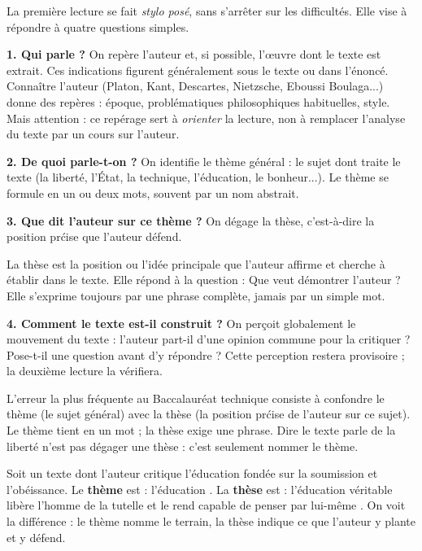 \documentclass[11pt]{article}
\newcommand{\cle}[1]{{\popxbold\color{popdark}#1}}
\newcounter{popsec}
\newcounter{popsub}
\newcommand{\courssub}[1]{%
  \stepcounter{popsub}%
  \par\vspace{9pt}\noindent{\popxbold\fontsize{11.5}{13}\selectfont\color{popink}{\color{poporange}\thepopsec.\thepopsub}\hspace{6pt}#1}\par\nopagebreak\vspace{4pt}
}
\begin{document}
\courssub{La premi\`ere lecture : lecture globale}

La premi\`ere lecture se fait \emph{stylo pos\'e}, sans s'arr\^eter sur les difficult\'es. Elle vise \`a r\'epondre \`a quatre questions simples.

\textbf{1. Qui parle ?} On rep\`ere l'\cle{auteur} et, si possible, l'\cle{\oe uvre} dont le texte est extrait. Ces indications figurent g\'en\'eralement sous le texte ou dans l'\'enonc\'e. Conna\^itre l'auteur (Platon, Kant, Descartes, Nietzsche, Eboussi Boulaga...) donne des rep\`eres : \'epoque, probl\'ematiques philosophiques habituelles, style. Mais attention : ce rep\'erage sert \`a \emph{orienter} la lecture, non \`a remplacer l'analyse du texte par un cours sur l'auteur.

\textbf{2. De quoi parle-t-on ?} On identifie le \cle{th\`eme g\'en\'eral} : le sujet dont traite le texte (la libert\'e, l'\'Etat, la technique, l'\'education, le bonheur...). Le th\`eme se formule en un ou deux mots, souvent par un nom abstrait.

\textbf{3. Que dit l'auteur sur ce th\`eme ?} On d\'egage la \cle{th\`ese}, c'est-\`a-dire la position pr\'cise que l'auteur d\'efend.

\begin{definition}[La th\`ese]
La \cle{th\`ese} est la position ou l'id\'ee principale que l'auteur affirme et cherche \`a \'etablir dans le texte. Elle r\'epond \`a la question : \og Que veut d\'emontrer l'auteur ? \fg Elle s'exprime toujours par une phrase compl\`ete, jamais par un simple mot.
\end{definition}

\textbf{4. Comment le texte est-il construit ?} On per\c{c}oit globalement le mouvement du texte : l'auteur part-il d'une opinion commune pour la critiquer ? Pose-t-il une question avant d'y r\'epondre ? Cette perception restera provisoire ; la deuxi\`eme lecture la v\'erifiera.

\begin{attention}
L'erreur la plus fr\'equente au Baccalaur\'eat technique consiste \`a confondre le \cle{th\`eme} (le sujet g\'en\'eral) avec la \cle{th\`ese} (la position pr\'cise de l'auteur sur ce sujet). Le th\`eme tient en un mot ; la th\`ese exige une phrase. Dire \og le texte parle de la libert\'e \fg n'est pas d\'egager une th\`ese : c'est seulement nommer le th\`eme.
\end{attention}

\begin{exemplebox}
Soit un texte dont l'auteur critique l'\'education fond\'ee sur la soumission et l'ob\'eissance. Le \textbf{th\`eme} est : \og l'\'education \fg{}. La \textbf{th\`ese} est : \og l'\'education v\'eritable lib\`ere l'homme de la tutelle et le rend capable de penser par lui-m\^eme \fg{}. On voit la diff\'erence : le th\`eme nomme le terrain, la th\`ese indique ce que l'auteur y plante et y d\'efend.
\end{exemplebox}
\end{document}
